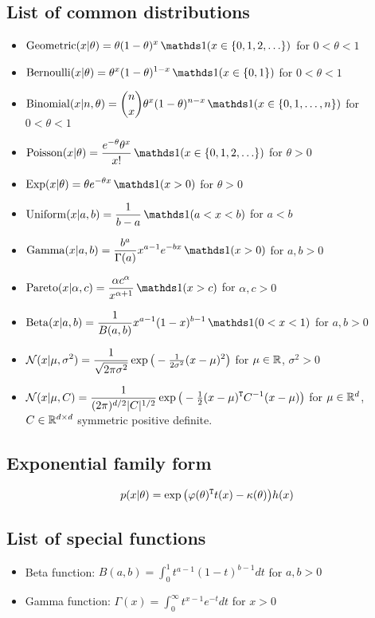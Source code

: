 \documentclass[12pt]{article}
\begin{document}
\newpage
\subsection*{List of common distributions}
\begin{itemize}
    \setlength\itemsep{1em}
    \item[] $\displaystyle \Geometric(x|\theta) = \theta(1-\theta)^x\,\I(x\in\{0,1,2,\ldots\})$ for $0<\theta<1$
    \item[] $\displaystyle \Bernoulli(x|\theta) = \theta^x(1-\theta)^{1-x}\,\I(x\in\{0,1\})$ for $0<\theta<1$
    \item[] $\displaystyle \Binomial(x|n,\theta) = {n\choose x}\theta^x(1-\theta)^{n-x}\,\I(x\in\{0,1,\ldots,n\})$ for $0<\theta<1$
    \item[] $\displaystyle \Poisson(x|\theta) = \frac{e^{-\theta}\theta^x}{x!}\,\I(x\in\{0,1,2,\ldots\})$ for $\theta>0$
    \item[] $\displaystyle \Exp(x|\theta) = \theta e^{-\theta x}\,\I(x>0)$ for $\theta>0$
    \item[] $\displaystyle \Uniform(x|a,b) = \frac{1}{b-a}\,\I(a<x<b)$ for $a<b$
    \item[] $\displaystyle \Ga(x|a,b) = \frac{b^a}{\Gamma(a)}x^{a-1}e^{-b x}\,\I(x>0)$ for $a,b>0$
    \item[] $\displaystyle \Pareto(x|\alpha,c) = \frac{\alpha c^\alpha}{x^{\alpha+1}}\,\I(x>c)$ for $\alpha,c>0$
    \item[] $\displaystyle \Beta(x|a,b) = \frac{1}{B(a,b)}x^{a-1}(1-x)^{b-1}\,\I(0<x<1)$ for $a,b>0$
    \item[] $\displaystyle \mathcal{N}(x|\mu,\sigma^2) = \frac{1}{\sqrt{2\pi\sigma^2}}\exp\big(-\tfrac{1}{2\sigma^2}(x-\mu)^2\big)$
        for $\mu\in\mathbb{R}$, $\sigma^2>0$
    \item[] $\displaystyle \mathcal{N}(x|\mu,C) = \frac{1}{(2\pi)^{d/2}|C|^{1/2}}\exp\big(-\tfrac{1}{2}(x-\mu)^{\mathtt{T}} C^{-1} (x-\mu)\big)$
        for $\mu\in\mathbb{R}^d$, $C\in\mathbb{R}^{d\times d}$ symmetric positive definite.
\end{itemize}

\subsection*{Exponential family form}
$$ p(x|\theta) =\exp\big(\varphi(\theta)^{\mathtt{T}} t(x)-\kappa(\theta)\big) h(x) $$

\subsection*{List of special functions}
\label{special-functions}
\begin{itemize}
    \setlength\itemsep{1em}
    \item[] Beta function: $\displaystyle B(a,b) = \int_0^1 t^{a-1}(1-t)^{b-1} d t$ for $a,b>0$
    \item[] Gamma function: $\displaystyle \Gamma(x) = \int_0^\infty t^{x-1} e^{-t} d t$ for $x>0$
\end{itemize}
\end{document}

